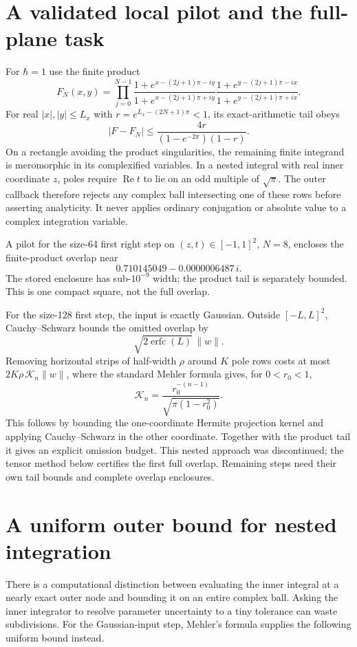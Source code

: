 \documentclass[11pt,a4paper]{article}
\begin{document}
\newpage
\section{A validated local pilot and the full-plane task}
For $\hbar=1$ use the finite product
\[
 F_N(x,y)=\prod_{j=0}^{N-1}
 \frac{1+e^{x-(2j+1)\pi-iy}}{1+e^{x-(2j+1)\pi+iy}}
 \frac{1+e^{y-(2j+1)\pi-ix}}{1+e^{y-(2j+1)\pi+ix}} .
\]
For real $|x|,|y|\le L_x$ with
$r=e^{L_x-(2N+1)\pi}<1$, its exact-arithmetic tail obeys
\[
 |F-F_N|\le\frac{4r}{(1-e^{-2\pi})(1-r)} .
\]
On a rectangle avoiding the product singularities, the remaining
finite integrand is meromorphic in its complexified variables.
In a nested integral with real inner coordinate $z$, poles require
$\operatorname{Re}t$ to lie on an odd multiple of $\sqrt\pi$.
The outer callback therefore rejects any complex ball intersecting
one of these rows before asserting analyticity. It never applies
ordinary conjugation or absolute value to a complex integration
variable.

A pilot for the size-64 first right step on $(z,t)\in[-1,1]^2$,
$N=8$, encloses the finite-product overlap near
\[
 0.710145049-0.0000006487\,i .
\]
The stored enclosure has sub-$10^{-9}$ width; the product tail is
separately bounded. This is one compact square, not the full overlap.

For the size-128 first step, the input is exactly Gaussian.
Outside $[-L,L]^2$, Cauchy--Schwarz bounds the omitted overlap by
\[
 \sqrt{2\operatorname{erfc}(L)}\,\|w\| .
\]
Removing horizontal strips of half-width $\rho$ around $K$ pole rows
costs at most $2K\rho\,\mathcal K_n\|w\|$, where the standard Mehler
formula gives, for $0<r_0<1$,
\[
 \mathcal K_n=\frac{r_0^{-(n-1)}}{\sqrt{\pi(1-r_0^2)}} .
\]
This follows by bounding the one-coordinate Hermite projection kernel
and applying Cauchy--Schwarz in the other coordinate. Together with
the product tail it gives an explicit omission budget. This nested
approach was discontinued; the tensor method below certifies the first
full overlap. Remaining steps need their own tail bounds and complete
overlap enclosures.

\newpage
\section{A uniform outer bound for nested integration}
There is a computational distinction between evaluating the inner
integral at a nearly exact outer node and bounding it on an entire
complex ball. Asking the inner integrator to resolve parameter
uncertainty to a tiny tolerance can waste subdivisions. For the
Gaussian-input step, Mehler's formula \cite{mehler} supplies the
following uniform bound instead.
\end{document}
